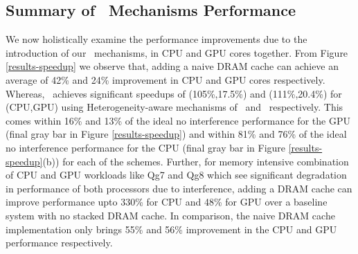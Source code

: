 \subsection{Summary of \cachename\ Mechanisms Performance}
We now holistically examine the performance improvements due to the introduction of our \cachename\ mechanisms, in  CPU and GPU cores together. From Figure \ref{results-speedup} we observe that, adding a naive DRAM cache can achieve an average of 42\% and 24\% improvement in CPU and GPU cores respectively. Whereas, \cachename\ achieves significant speedups of (105\%,17.5\%) and (111\%,20.4\%) for (CPU,GPU) using Heterogeneity-aware mechanisms of \bypassname\ and \chaining\ respectively. This comes within 16\% and 13\% of the ideal no interference performance for the GPU (final gray bar in Figure \ref{results-speedup}) and within 81\% and 76\% of the ideal no interference performance for the CPU (final gray bar in Figure \ref{results-speedup}(b)) for each of the schemes. Further, for memory intensive combination of CPU and GPU workloads like Qg7 and Qg8 which see significant degradation in performance of both processors due to interference, adding a DRAM cache can improve performance upto 330\% for CPU and 48\% for GPU over a baseline system with no stacked DRAM cache. In comparison, the naive DRAM cache implementation only brings 55\% and 56\% improvement in the CPU and GPU performance respectively.

